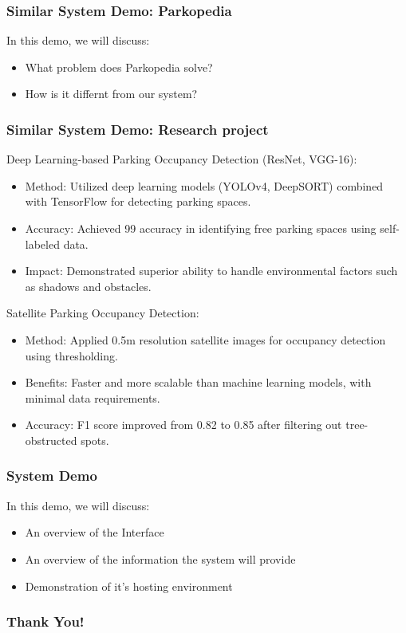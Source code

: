 \documentclass{beamer}
\begin{document}
\begin{frame}
    \frametitle{Similar System Demo: Parkopedia}
    In this demo, we will discuss:
    \begin{itemize}
        \item{What problem does Parkopedia solve?}
        \item{How is it differnt from our system?}
    \end{itemize}

\end{frame}

\begin{frame}
    \frametitle{Similar System Demo: Research project}
    Deep Learning-based Parking Occupancy Detection (ResNet, VGG-16):
    \begin{itemize}
        \item{Method: Utilized deep learning models (YOLOv4, DeepSORT) combined with TensorFlow for detecting parking spaces.}
        \item{Accuracy: Achieved 99 accuracy in identifying free parking spaces using self-labeled data.}
        \item{Impact: Demonstrated superior ability to handle environmental factors such as shadows and obstacles.}
    \end{itemize}
    Satellite Parking Occupancy Detection:
    \begin{itemize}
        \item{Method: Applied 0.5m resolution satellite images for occupancy detection using thresholding.}
        \item{Benefits: Faster and more scalable than machine learning models, with minimal data requirements.}
        \item{Accuracy: F1 score improved from 0.82 to 0.85 after filtering out tree-obstructed spots.}
    \end{itemize}
\end{frame}


\begin{frame}
    \frametitle{System Demo}
    In this demo, we will discuss:
    \begin{itemize}
        \item{An overview of the Interface}
        \item{An overview of the information the system will provide}
        \item{Demonstration of it's hosting environment}
    \end{itemize}
\end{frame}


\begin{frame}
    \frametitle{Thank You!}
\end{frame}
\end{document}
